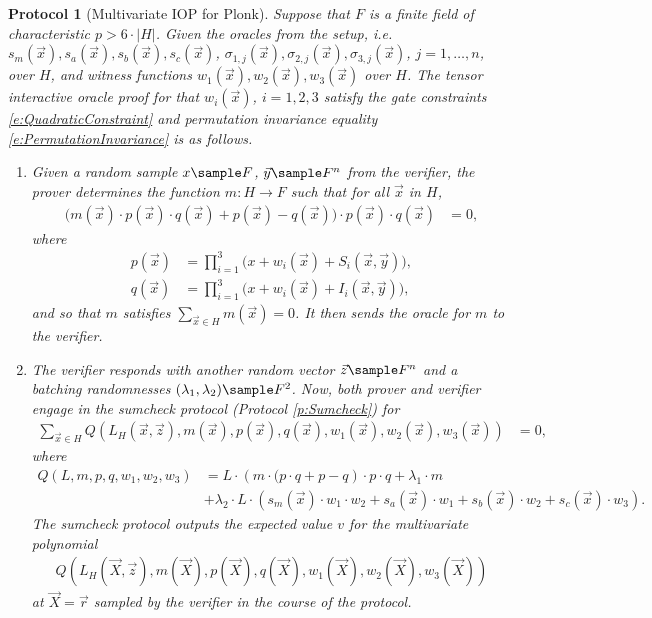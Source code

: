 \documentclass[11pt]{article}
\newtheorem{protocol}[]{Protocol}
\theoremstyle{definition}
\theoremstyle{remark}
\begin{document}
\begin{protocol}[Multivariate IOP for Plonk]
Suppose that $F$ is a finite field of characteristic $p > 6\cdot |H|$.
Given the oracles from the setup, i.e. $s_m(\vec x), s_a(\vec x), s_b(\vec x), s_c(\vec x)$, $\sigma_{1,j}(\vec x),\sigma_{2,j}(\vec x), \sigma_{3,j}(\vec x)$, $j=1,\ldots,n$,  over $H$,  and witness functions $w_1(\vec x), w_2(\vec x), w_3(\vec x)$ over $H$.
The tensor interactive oracle proof for that $w_i(\vec x)$, $i=1,2,3$ satisfy the gate constraints \eqref{e:QuadraticConstraint} and permutation invariance equality \eqref{e:PermutationInvariance} is as follows.
\begin{enumerate} 
\item
\label{i:PAstep1}
Given a random sample $x \sample F$, $\vec y\sample F^n$ from the verifier, the prover determines the function $m: H\rightarrow F$ such that for all $\vec x$ in $H$,
\begin{align} 
\label{e:m}
\Big(
m(\vec x)\cdot p(\vec x) \cdot q(\vec x)  + p(\vec x) - q(\vec x)\Big)
\cdot  p(\vec x)\cdot q(\vec x) &= 0,
\end{align}
where 
\begin{align}
p(\vec x) &= \prod_{i=1}^3 \big( x + w_i(\vec x) + S_i (\vec x, \vec y)\big),
\\
q(\vec x) &= \prod_{i=1}^3 \big( x + w_i(\vec x) + I_i (\vec x, \vec y)\big),
\end{align}
and so that $m$ satisfies $\sum_{\vec x\in H} m(\vec x) = 0$.
It then sends the oracle for $m$ to the verifier.

\item
\label{i:PAstep2}
The verifier responds with another random vector $\vec z \sample F^n$ and a batching randomnesses $(\lambda_1,\lambda_2)\sample F^2$.
Now, both prover and verifier engage in the sumcheck protocol (Protocol \ref{p:Sumcheck}) for 
\begin{align} 
\label{e:PlonkSumcheckm}
	\sum_{\vec x \in H} Q(L_H(\vec x, \vec z), m(\vec x),  p(\vec x), q(\vec x), w_1(\vec x), w_2(\vec x), w_3(\vec x))&= 0,
\end{align}
where 
\begin{equation}
\begin{aligned}
Q(L , m, p, q, w_1, w_2, w_3) &=   
L \cdot  \left(m\cdot ( p \cdot q + p - q\right)\cdot  p \cdot q +  \lambda_1 \cdot m
\\
&+ \lambda_2 \cdot L \cdot \left( s_m(\vec x)\cdot w_1\cdot w_2 + s_a(\vec x)\cdot w_1 + s_b(\vec x)\cdot w_2 + s_c(\vec x)\cdot w_3\right).
\end{aligned}
\end{equation}
The sumcheck protocol outputs the expected value $v$ for the multivariate polynomial 
\begin{equation}
\label{e:PlonkSumcheckPoly}
\begin{aligned}
Q(L_H(\vec X, \vec z), m(\vec X),  p(\vec X), q(\vec X), w_1(\vec X), w_2(\vec X), w_3(\vec X))
\end{aligned}
\end{equation}
at $\vec X=\vec r$ sampled by the verifier in the course of the protocol.


\end{enumerate}
\end{protocol}
\end{document}
